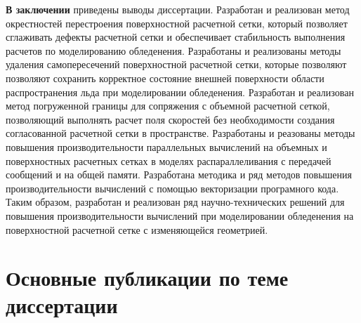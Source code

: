 \documentclass[a4paper,14pt]{extarticle}                     %
\theoremstyle{plain}                                         %
\begin{document}

\textbf{В заключении} приведены выводы диссертации.
Разработан и реализован метод окрестностей перестроения поверхностной расчетной сетки, который позволяет сглаживать дефекты расчетной сетки и обеспечивает стабильность выполнения расчетов по моделированию обледенения.
Разработаны и реализованы методы удаления самопересечений поверхностной расчетной сетки, которые позволяют позволяют сохранить корректное состояние внешней поверхности области распространения льда при моделировании обледенения.
Разработан и реализован метод погруженной границы для сопряжения с объемной расчетной сеткой, позволяющий выполнять расчет поля скоростей без необходимости создания согласованной расчетной сетки в пространстве.
Разработаны и реазованы методы повышения производительности параллельных вычислений на объемных и поверхностных расчетных сетках в моделях распараллеливания с передачей сообщений и на общей памяти.
Разработана методика и ряд методов повышения производительности вычислений с помощью векторизации програмного кода.
Таким образом, разработан и реализован ряд научно-технических решений для повышения производительности вычислений при моделировании обледенения на поверхностной расчетной сетке с изменяющейся геометрией.

\section*{Основные публикации по теме диссертации}
\end{document}

